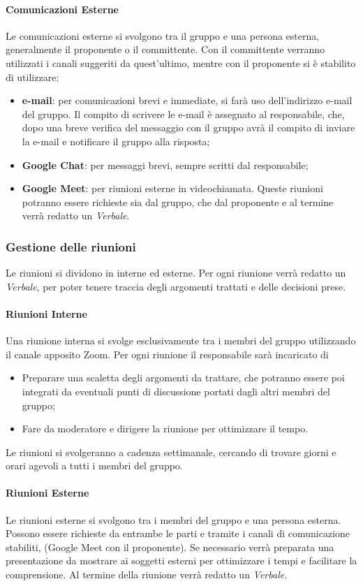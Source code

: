 \paragraph{Comunicazioni Esterne}
Le comunicazioni esterne si svolgono tra il gruppo e una persona esterna, generalmente il proponente o il committente. Con il 
committente verranno utilizzati i canali suggeriti da quest'ultimo, mentre con il proponente si è stabilito di utilizzare:
 \begin{itemize}
    \item \textbf{e-mail}: per comunicazioni brevi e immediate, si farà uso dell'indirizzo e-mail del gruppo. Il compito di scrivere le e-mail è assegnato al 
    responsabile, che, dopo una breve verifica del messaggio con il gruppo avrà il compito di inviare la e-mail e notificare il gruppo alla risposta;
    \item \textbf{Google Chat}: per messaggi brevi, sempre scritti dal responsabile;
    \item \textbf{Google Meet}: per riunioni esterne in videochiamata. Queste riunioni potranno essere 
    richieste sia dal gruppo, che dal proponente e al termine verrà redatto un \textit{Verbale}. 
\end{itemize}

\subsubsection{Gestione delle riunioni}
Le riunioni si dividono in interne ed esterne. Per ogni riunione verrà redatto un \textit{Verbale}, per poter tenere traccia 
degli argomenti trattati e delle decisioni prese.

\paragraph{Riunioni Interne}
Una riunione interna si svolge esclusivamente tra i membri del gruppo utilizzando il canale apposito Zoom. Per ogni riunione 
il responsabile sarà incaricato di 
\begin{itemize}
    \item Preparare una scaletta degli argomenti da trattare, che potranno essere poi integrati da 
    eventuali punti di discussione portati dagli altri membri del gruppo;
    \item Fare da moderatore e dirigere la riunione per ottimizzare il tempo.
\end{itemize}

Le riunioni si svolgeranno a cadenza settimanale, cercando di trovare giorni e orari agevoli a tutti i membri del gruppo.

\paragraph{Riunioni Esterne}
Le riunioni esterne si svolgono tra i membri del gruppo e una persona esterna. Possono essere richieste da entrambe le parti 
e tramite i canali di comunicazione stabiliti, (Google Meet con il proponente). Se necessario verrà preparata una presentazione 
da mostrare ai soggetti esterni per ottimizzare i tempi e facilitare la comprensione. Al termine della riunione verrà redatto un 
\textit{Verbale}. 
